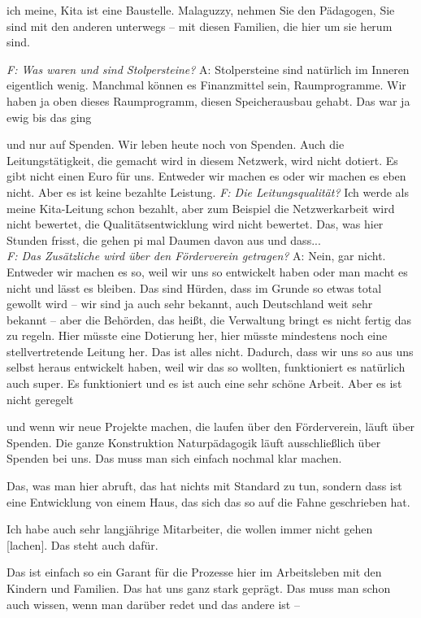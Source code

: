\begin{linenumbers*}
ich meine, Kita ist eine Baustelle. Malaguzzy, nehmen Sie den Pädagogen, Sie sind mit den anderen unterwegs -- mit diesen Familien, die hier um sie herum sind. 

\emph{F: Was waren und sind Stolpersteine?}
A: Stolpersteine sind natürlich im Inneren eigentlich wenig. Manchmal können es Finanzmittel sein, Raumprogramme. Wir haben ja oben dieses Raumprogramm, diesen Speicherausbau gehabt. Das war ja ewig bis das ging 

und nur auf Spenden. Wir leben heute noch von Spenden. Auch die Leitungstätigkeit, die gemacht wird in diesem Netzwerk, wird nicht dotiert. Es gibt nicht einen Euro für uns. Entweder wir machen es oder wir machen es eben nicht. Aber es ist keine bezahlte Leistung.          
\emph{F: Die Leitungsqualität?}
Ich werde als meine Kita-Leitung schon bezahlt, aber zum Beispiel die Netzwerkarbeit wird nicht bewertet, die Qualitätsentwicklung wird nicht bewertet. Das, was hier Stunden frisst, die gehen pi mal Daumen davon aus und dass...\\
\emph{F: Das Zusätzliche wird über den Förderverein getragen?}
A: Nein, gar nicht. 
Entweder wir machen es so, weil wir uns so entwickelt haben oder man macht es nicht und lässt es bleiben. Das sind Hürden, dass im Grunde so etwas total gewollt wird -- wir sind ja auch sehr bekannt, auch Deutschland weit sehr bekannt -- aber die Behörden, das heißt, die Verwaltung bringt es nicht fertig das zu regeln. Hier müsste eine Dotierung her, hier müsste mindestens noch eine stellvertretende Leitung her. Das ist alles nicht. Dadurch, dass wir uns so aus uns selbst heraus entwickelt haben, weil wir das so wollten, funktioniert es natürlich auch super. Es funktioniert und es ist auch eine sehr schöne Arbeit. Aber es ist nicht geregelt 

und wenn wir neue Projekte machen, die laufen über den Förderverein, läuft über Spenden. Die ganze Konstruktion Naturpädagogik läuft ausschließlich über Spenden bei uns.
Das muss man sich einfach nochmal klar machen. 

Das, was man hier abruft, das hat nichts mit Standard zu tun, sondern dass ist eine Entwicklung von einem Haus, das sich das so auf die Fahne geschrieben hat.
 
Ich habe auch sehr langjährige Mitarbeiter, die wollen immer nicht gehen
{[lachen]}. Das steht auch dafür. 

Das ist einfach so ein Garant für die Prozesse hier im Arbeitsleben mit den Kindern und Familien. Das hat uns ganz stark geprägt. Das muss man schon auch wissen, wenn man darüber redet und das andere ist -- 


\end{linenumbers*}

